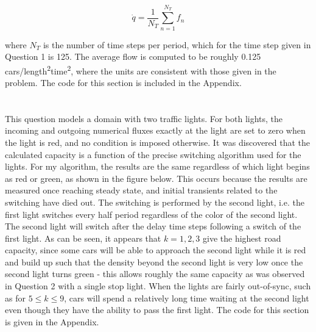 \documentclass[10pt]{article}
\newcommand{\beq}{\begin{equation}}
\newcommand{\eeq}{\end{equation}}
\begin{document}
\beq
\dot{q}=\frac{1}{N_T}\sum_{n=1}^{N_T}f_n
\eeq

where \(N_T\) is the number of time steps per period, which for the time step given in Question 1 is 125. The average flow is computed to be roughly 0.125 cars/length\textsuperscript{2}time\textsuperscript{2}, where the units are consistent with those given in the problem. The code for this section is included in the Appendix.




\section{}
This question models a domain with two traffic lights. For both lights, the incoming and outgoing numerical fluxes exactly at the light are set to zero when the light is red, and no condition is imposed otherwise. It was discovered that the calculated capacity is a function of the precise switching algorithm used for the lights. For my algorithm, the results are the same regardless of which light begins as red or green, as shown in the figure below. This occurs because the results are measured once reaching steady state, and initial transients related to the switching have died out. The switching is performed by the second light, i.e. the first light switches every half period regardless of the color of the second light. The second light will switch after the delay time steps following a switch of the first light. As can be seen, it appears that \(k=1, 2, 3\) give the highest road capacity, since some cars will be able to approach the second light while it is red and build up such that the density beyond the second light is very low once the second light turns green - this allows roughly the same capacity as was observed in Question 2 with a single stop light. When the lights are fairly out-of-sync, such as for \(5\leq k\leq 9\), cars will spend a relatively long time waiting at the second light even though they have the ability to pass the first light. The code for this section is given in the Appendix.
\end{document}
